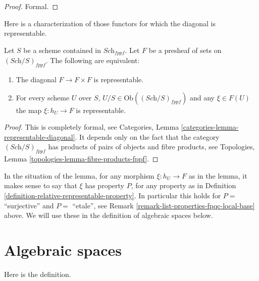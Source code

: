 \begin{proof}
Formal.
\end{proof}


\noindent
Here is a characterization of those functors for which the
diagonal is representable.

\begin{lemma}
\label{lemma-representable-diagonal}
Let $S$ be a scheme contained in $\textit{Sch}_{fppf}$.
Let $F$ be a presheaf of sets on $(\textit{Sch}/S)_{fppf}$.
The following are equivalent:
\begin{enumerate}
\item The diagonal $F \to F \times F$ is representable.
\item For every scheme $U$ over $S$,
$U/S \in \text{Ob}((\textit{Sch}/S)_{fppf})$
and any $\xi \in F(U)$ the map $\xi : h_U \to F$ is representable.
\end{enumerate}
\end{lemma}

\begin{proof}
This is completely formal, see
Categories, Lemma \ref{categories-lemma-representable-diagonal}.
It depends only on the fact that the category $(\textit{Sch}/S)_{fppf}$
has products of pairs of objects and fibre products, see
Topologies, Lemma \ref{topologies-lemma-fibre-products-fppf}.
\end{proof}

\noindent
In the situation of the lemma, for any morphism
$\xi : h_U \to F$ as in the lemma, it makes sense
to say that $\xi$ has property $P$, for any property
as in Definition \ref{definition-relative-representable-property}.
In particular this holds for $P = $ ``surjective'' and $P = $ ``etale'', see
Remark \ref{remark-list-properties-fpqc-local-base}
above. We will use these in the definition
of algebraic spaces below. 


















\section{Algebraic spaces}
\label{section-algebraic-spaces}

\noindent
Here is the definition.

